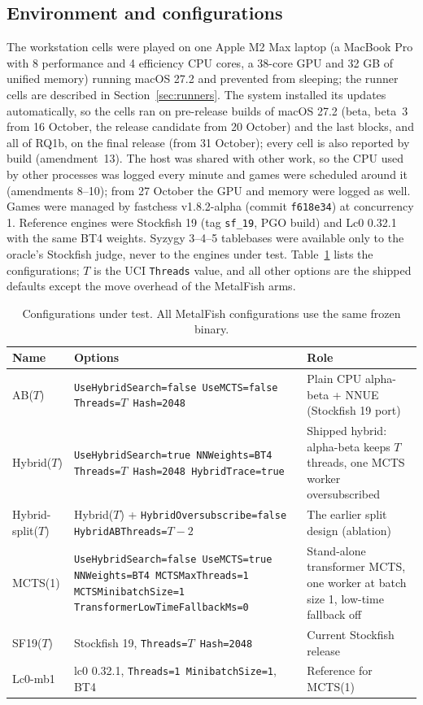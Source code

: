 \documentclass{article}
\newcommand{\MF}{MetalFish}
\begin{document}
\subsection{Environment and configurations}
The workstation cells were played on one Apple M2 Max laptop (a MacBook Pro with 8 performance and 4 efficiency CPU cores, a 38-core GPU and 32 GB of unified memory) running macOS 27.2 and prevented from sleeping; the runner cells are described in Section~\ref{sec:runners}. The system installed its updates automatically, so the cells ran on pre-release builds of macOS 27.2 (beta, beta~3 from 16 October, the release candidate from 20 October) and the last blocks, and all of RQ1b, on the final release (from 31 October); every cell is also reported by build (amendment~13). The host was shared with other work, so the CPU used by other processes was logged every minute and games were scheduled around it (amendments 8--10); from 27 October the GPU and memory were logged as well. Games were managed by fastchess v1.8.2-alpha (commit \texttt{f618e34}) at concurrency 1. Reference engines were Stockfish 19 (tag \texttt{sf\_19}, PGO build) and Lc0 0.32.1 with the same BT4 weights. Syzygy 3--4--5 tablebases were available only to the oracle's Stockfish judge, never to the engines under test. Table~\ref{tab:configs} lists the configurations; $T$ is the UCI \texttt{Threads} value, and all other options are the shipped defaults except the move overhead of the \MF{} arms.

\begin{table}[t]
\centering
\caption{Configurations under test. All \MF{} configurations use the same frozen binary.}
\label{tab:configs}
\footnotesize
\begin{tabular}{p{2.3cm}p{6.6cm}p{5.6cm}}
\toprule
Name & Options & Role \\
\midrule
AB($T$) & \texttt{UseHybridSearch=false UseMCTS=false Threads=$T$ Hash=2048} & Plain CPU alpha-beta + NNUE (Stockfish 19 port) \\
Hybrid($T$) & \texttt{UseHybridSearch=true NNWeights=BT4 Threads=$T$ Hash=2048 HybridTrace=true} & Shipped hybrid: alpha-beta keeps $T$ threads, one MCTS worker oversubscribed \\
Hybrid-split($T$) & Hybrid($T$) + \texttt{HybridOversubscribe=false HybridABThreads=$T-2$} & The earlier split design (ablation) \\
MCTS(1) & \texttt{UseHybridSearch=false UseMCTS=true NNWeights=BT4 MCTSMaxThreads=1 MCTSMinibatchSize=1 TransformerLowTimeFallbackMs=0} & Stand-alone transformer MCTS, one worker at batch size 1, low-time fallback off \\
SF19($T$) & Stockfish 19, \texttt{Threads=$T$ Hash=2048} & Current Stockfish release \\
Lc0-mb1 & lc0 0.32.1, \texttt{Threads=1 MinibatchSize=1}, BT4 & Reference for MCTS(1) \\
\bottomrule
\end{tabular}
\end{table}
\end{document}
